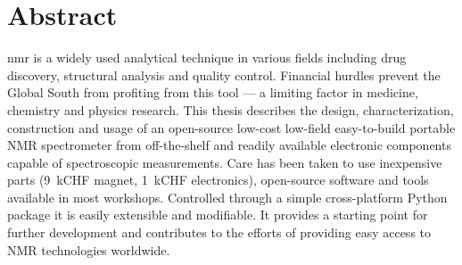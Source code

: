 \chapter*{Abstract}

\acrfull{nmr} is a widely used analytical technique in various fields including drug discovery, structural analysis and quality control. Financial hurdles prevent the Global South from profiting from this tool --- a limiting factor in medicine, chemistry and physics research.
This thesis describes the design, characterization, construction and usage of an open-source low-cost low-field easy-to-build portable NMR spectrometer from off-the-shelf and readily available electronic components capable of spectroscopic measurements. Care has been taken to use inexpensive parts (\approx{}\qty{9}{kCHF} magnet, \approx{}\qty{1}{kCHF} electronics), open-source software and tools available in most workshops. Controlled through a simple cross-platform Python package it is easily extensible and modifiable. It provides a starting point for further development and contributes to the efforts of providing easy access to NMR technologies worldwide.